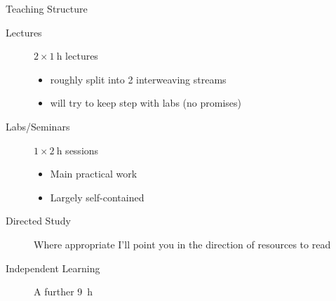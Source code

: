 \documentclass[xcolor=svgnames]{beamer}
\begin{document}
\begin{frame}{Teaching Structure}
  \begin{description}
    \item[Lectures] $2 \times \SI{1}{\hour}$ lectures
    \begin{itemize}
      \item roughly split into 2 interweaving streams
      \item will try to keep step with labs (no promises)
    \end{itemize}
    \item[Labs/Seminars] $1\times\SI{2}{\hour}$ sessions
    \begin{itemize}
      \item Main practical work
      \item Largely self-contained
    \end{itemize}
    \item[Directed Study] Where appropriate I'll point you in the direction of resources to read
    \item[Independent Learning] A further \SI{9}{\hour}
\end{description}
\end{frame}
\end{document}
